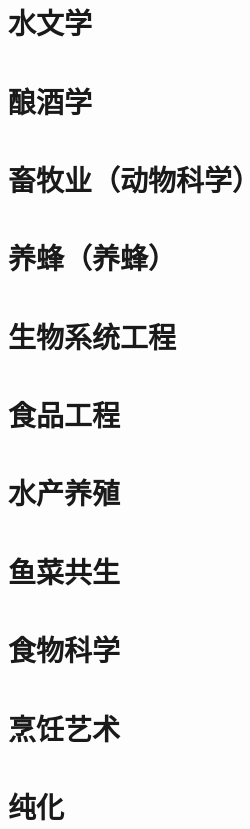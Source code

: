 \documentclass[UTF8]{../ApplicationUniverse}
\begin{document}
\section{水文学}
\section{酿酒学}
\section{畜牧业（动物科学）}
\section{养蜂（养蜂）}
\section{生物系统工程}
\section{食品工程}
\section{水产养殖}
\section{鱼菜共生}
\section{食物科学}
\section{烹饪艺术}
\section{纯化}
\end{document}
